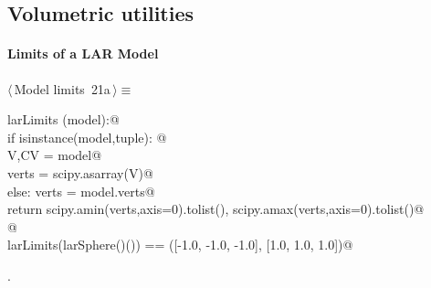 \documentclass[11pt,oneside]{article}	%
\begin{document}
\subsection{Volumetric utilities}


\paragraph{Limits of a LAR Model}
\begin{flushleft} \small \label{scrap39}
\protect{}$\langle\,$Model limits\nobreak\ {\footnotesize 21a}$\,\rangle\equiv$
\vspace{-1ex}
\begin{list}{}{} \item
\mbox{}\verb@def larLimits (model):@\\
\mbox{}\verb@   if isinstance(model,tuple): @\\
\mbox{}\verb@      V,CV = model@\\
\mbox{}\verb@      verts = scipy.asarray(V)@\\
\mbox{}\verb@   else: verts = model.verts@\\
\mbox{}\verb@   return scipy.amin(verts,axis=0).tolist(), scipy.amax(verts,axis=0).tolist()@\\
\mbox{}\verb@   @\\
\mbox{}\verb@assert larLimits(larSphere()()) == ([-1.0, -1.0, -1.0], [1.0, 1.0, 1.0])@\\
\mbox{}\verb@@{\NWsep}
\end{list}
\vspace{-1ex}
\footnotesize\addtolength{\baselineskip}{-1ex}
\begin{list}{}{\setlength{\itemsep}{-\parsep}\setlength{\itemindent}{-\leftmargin}}
\item {\NWtxtMacroNoRef}.
\end{list}
\end{flushleft}
\end{document}
